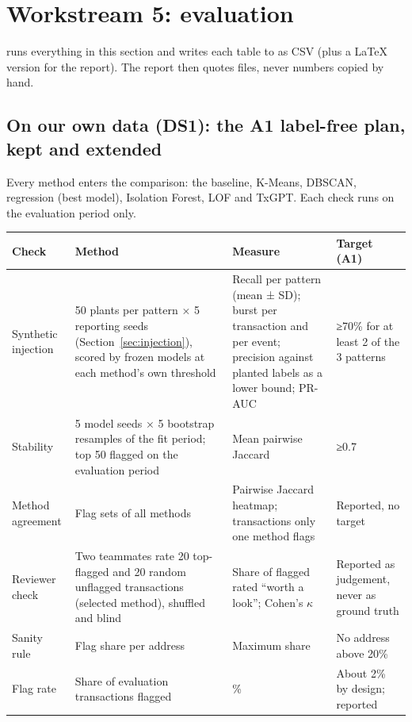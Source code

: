 \section{Workstream 5: evaluation}
\label{sec:evaluation}

 runs everything in this section and writes each table to
 as CSV (plus a LaTeX version for the report). The report then quotes files,
never numbers copied by hand.

\subsection{On our own data (DS1): the A1 label-free plan, kept and extended}

Every method enters the comparison: the baseline, K-Means, DBSCAN, regression (best model),
Isolation Forest, LOF and TxGPT. Each check runs on the evaluation period only.

\begin{longtable}{@{}L{2.6cm}L{6.2cm}L{2.6cm}L{2.8cm}@{}}
\toprule
\textbf{Check} & \textbf{Method} & \textbf{Measure} & \textbf{Target (A1)} \\
\midrule
\endhead
Synthetic injection & 50 plants per pattern × 5 reporting seeds (Section~\ref{sec:injection}), scored by frozen models at each method's own threshold & Recall per pattern (mean ± SD); burst per transaction and per event; precision against planted labels as a lower bound; PR-AUC & ≥70\% for at least 2 of the 3 patterns \\
Stability & 5 model seeds × 5 bootstrap resamples of the fit period; top 50 flagged on the evaluation period & Mean pairwise Jaccard & ≥0.7 \\
Method agreement & Flag sets of all methods & Pairwise Jaccard heatmap; transactions only one method flags & Reported, no target \\
Reviewer check & Two teammates rate 20 top-flagged and 20 random unflagged transactions (selected method), shuffled and blind & Share of flagged rated ``worth a look''; Cohen's $\kappa$ & Reported as judgement, never as ground truth \\
Sanity rule & Flag share per address & Maximum share & No address above 20\% \\
Flag rate & Share of evaluation transactions flagged & \% & About 2\% by design; reported \\
\bottomrule
\end{longtable}

